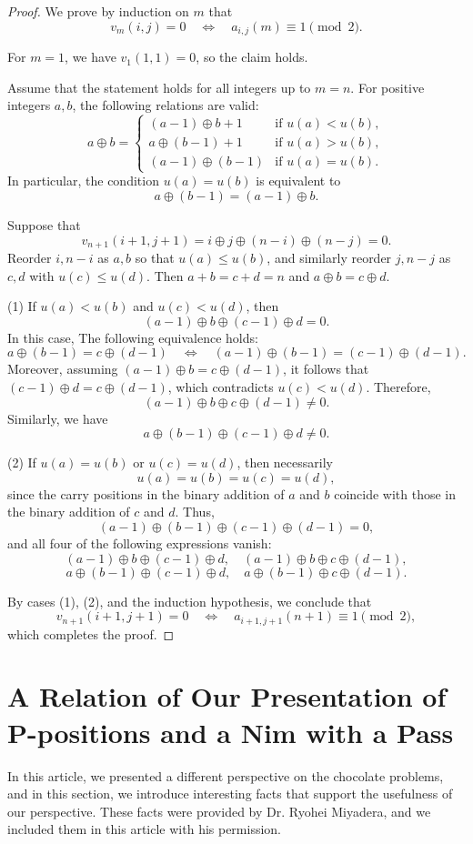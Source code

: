 \documentclass{article}
\theoremstyle{definition}
\theoremstyle{plain}
\theoremstyle{remark}
\begin{document}
\begin{proof}
We prove by induction on $m$ that
\[
v_m(i,j) = 0
\quad \Longleftrightarrow \quad
a_{i,j}(m) \equiv 1 \pmod{2}.
\]

For $m=1$, we have $v_1(1,1)=0$, so the claim holds.

Assume that the statement holds for all integers up to $m=n$.
For positive integers $a,b$, the following relations are valid:
\[
a \oplus b =
\begin{cases}
(a-1)\oplus b + 1 & \text{if } u(a) < u(b), \\
a \oplus (b-1) + 1 & \text{if } u(a) > u(b), \\
(a-1)\oplus (b-1) & \text{if } u(a) = u(b).
\end{cases}
\]
In particular, the condition $u(a)=u(b)$ is equivalent to
\[
a \oplus (b-1) = (a-1)\oplus b.
\]

Suppose that
\[
v_{n+1}(i+1,j+1)
= i \oplus j \oplus (n-i) \oplus (n-j) = 0.
\]
Reorder $i,n-i$ as $a,b$ so that $u(a) \le u(b)$, and similarly reorder $j,n-j$ as $c,d$ with $u(c) \le u(d)$.
Then $a+b=c+d=n$ and $a\oplus b=c\oplus d$.

\medskip
\noindent
(1) If \(u(a) < u(b)\) and \(u(c) < u(d)\), then
\[
(a-1)\oplus b \oplus (c-1)\oplus d = 0.
\]
In this case, The following equivalence holds:
\[
a\oplus(b-1)=c\oplus(d-1)
\quad \Longleftrightarrow \quad
(a-1)\oplus(b-1)=(c-1)\oplus(d-1).
\]
Moreover, assuming \((a-1) \oplus b = c \oplus (d-1)\), it follows that
\((c-1) \oplus d = c \oplus (d-1)\), which contradicts \(u(c) < u(d)\).
Therefore,
\[
(a-1) \oplus b \oplus c \oplus (d-1) \neq 0.
\]
Similarly, we have
\[
a \oplus (b-1) \oplus (c-1) \oplus d \neq 0.
\]


\medskip
\noindent
(2) If $u(a)=u(b)$ or $u(c)=u(d)$, then necessarily
\[
u(a)=u(b)=u(c)=u(d),
\]
since the carry positions in the binary addition of $a$ and $b$ coincide with those in the binary addition of $c$ and $d$.
Thus,
\[
(a-1)\oplus(b-1)\oplus(c-1)\oplus(d-1)=0,
\]
and all four of the following expressions vanish:
\[
(a-1)\oplus b \oplus (c-1)\oplus d,
\quad
(a-1)\oplus b \oplus c \oplus (d-1),
\]
\[
a\oplus(b-1)\oplus(c-1)\oplus d,
\quad
a\oplus(b-1)\oplus c \oplus (d-1).
\]

By cases (1), (2), and the induction hypothesis, we conclude that
\[
v_{n+1}(i+1,j+1)=0
\quad \Longleftrightarrow \quad
a_{i+1,j+1}(n+1) \equiv 1 \pmod{2},
\]
which completes the proof.
\end{proof}


\section{A Relation of Our Presentation of P-positions and a Nim with a Pass}
In this article, we presented a different perspective on the chocolate problems, and in this section, we introduce interesting facts that support the usefulness of our perspective. These facts were provided by Dr. Ryohei Miyadera, and we included them in this article with his permission.
\end{document}
